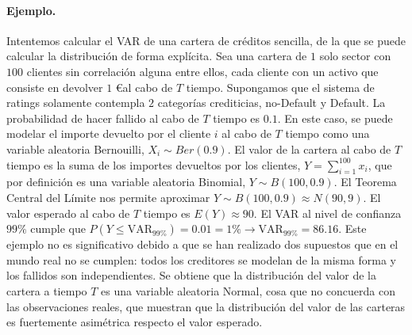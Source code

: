 \paragraph{Ejemplo.} Intentemos calcular el VAR de una cartera de cr\'editos
sencilla, de la que se puede calcular la distribuci\'on de forma expl\'icita. 
Sea una cartera de $1$ solo sector con $100$ clientes sin correlaci\'on alguna
entre ellos, cada cliente con un activo que consiste en devolver $1$ \euro al 
cabo de $T$ tiempo. Supongamos que el sistema de ratings solamente contempla 
$2$ categor\'ias crediticias, no-Default y Default. La probabilidad de hacer 
fallido al cabo de $T$ tiempo es $0.1$.
\newline
\newline
En este caso, se puede modelar el importe devuelto por el cliente $i$ al cabo 
de $T$ tiempo como una variable aleatoria Bernouilli, $X_i \sim Ber(0.9)$. El 
valor de la cartera al cabo de $T$ tiempo es la suma de los importes devueltos 
por los clientes, $Y = \sum_{i=1}^{100} x_i$, que por definici\'on es una 
variable aleatoria Binomial, $Y \sim B(100,0.9)$. El Teorema Central del 
L\'imite nos permite aproximar $Y \sim B(100,0.9) \approx N(90, 9)$.
\newline
\newline
El valor esperado al cabo de $T$ tiempo es $E(Y) \approx 90$. El VAR al nivel 
de confianza $99\%$ cumple que $P(Y \leq \textrm{VAR}_{99\%}) = 0.01 = 1\% 
\longrightarrow \textrm{VAR}_{99\%}=86.16$.
\newline
\newline
Este ejemplo no es significativo debido a que se han realizado dos supuestos 
que en el mundo real no se cumplen: todos los creditores se modelan de la misma 
forma y los fallidos son independientes. Se obtiene que la distribuci\'on del 
valor de la cartera a tiempo $T$ es una variable aleatoria Normal, cosa que no
concuerda con las observaciones reales, que muestran que la distribuci\'on del 
valor de las carteras es fuertemente asim\'etrica respecto el valor esperado.

